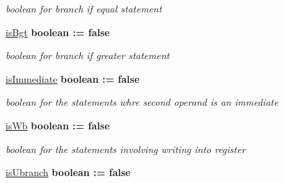 \begin{DoxyCompactItemize}
\begin{DoxyCompactList}\small\item\em boolean for branch if equal statement \end{DoxyCompactList}\item 
\hypertarget{class_simple_r_i_s_c_1_1main_a2cf6112b9dbca878e9315f777120a60a}{\hyperlink{class_simple_r_i_s_c_1_1main_a2cf6112b9dbca878e9315f777120a60a}{is\-Bgt} {\bfseries \textcolor{comment}{boolean}\textcolor{vhdlchar}{ }\textcolor{vhdlchar}{ }\textcolor{vhdlchar}{\-:}\textcolor{vhdlchar}{=}\textcolor{vhdlchar}{ }\textcolor{vhdlchar}{false}\textcolor{vhdlchar}{ }} }\label{class_simple_r_i_s_c_1_1main_a2cf6112b9dbca878e9315f777120a60a}

\begin{DoxyCompactList}\small\item\em boolean for branch if greater statement \end{DoxyCompactList}\item 
\hypertarget{class_simple_r_i_s_c_1_1main_a74ba3cf06911e5201a3e2f3f32213258}{\hyperlink{class_simple_r_i_s_c_1_1main_a74ba3cf06911e5201a3e2f3f32213258}{is\-Immediate} {\bfseries \textcolor{comment}{boolean}\textcolor{vhdlchar}{ }\textcolor{vhdlchar}{ }\textcolor{vhdlchar}{\-:}\textcolor{vhdlchar}{=}\textcolor{vhdlchar}{ }\textcolor{vhdlchar}{false}\textcolor{vhdlchar}{ }} }\label{class_simple_r_i_s_c_1_1main_a74ba3cf06911e5201a3e2f3f32213258}

\begin{DoxyCompactList}\small\item\em boolean for the statements whre second operand is an immediate \end{DoxyCompactList}\item 
\hypertarget{class_simple_r_i_s_c_1_1main_ad9bc07a81c4a0f0e8290dd663797eaac}{\hyperlink{class_simple_r_i_s_c_1_1main_ad9bc07a81c4a0f0e8290dd663797eaac}{is\-Wb} {\bfseries \textcolor{comment}{boolean}\textcolor{vhdlchar}{ }\textcolor{vhdlchar}{ }\textcolor{vhdlchar}{\-:}\textcolor{vhdlchar}{=}\textcolor{vhdlchar}{ }\textcolor{vhdlchar}{false}\textcolor{vhdlchar}{ }} }\label{class_simple_r_i_s_c_1_1main_ad9bc07a81c4a0f0e8290dd663797eaac}

\begin{DoxyCompactList}\small\item\em boolean for the statements involving writing into register \end{DoxyCompactList}\item 
\hypertarget{class_simple_r_i_s_c_1_1main_a2554956e68f2502184e2b11c6d0bf726}{\hyperlink{class_simple_r_i_s_c_1_1main_a2554956e68f2502184e2b11c6d0bf726}{is\-Ubranch} {\bfseries \textcolor{comment}{boolean}\textcolor{vhdlchar}{ }\textcolor{vhdlchar}{ }\textcolor{vhdlchar}{\-:}\textcolor{vhdlchar}{=}\textcolor{vhdlchar}{ }\textcolor{vhdlchar}{false}\textcolor{vhdlchar}{ }} }\label{class_simple_r_i_s_c_1_1main_a2554956e68f2502184e2b11c6d0bf726}


\end{DoxyCompactItemize}
